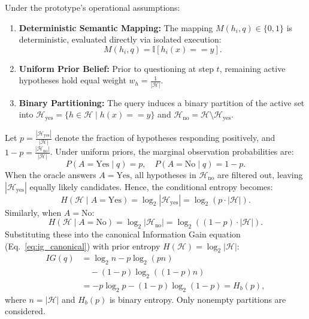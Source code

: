 Under the prototype's operational assumptions:
\begin{enumerate}
    \item \textbf{Deterministic Semantic Mapping:} The mapping $M(h_i, q) \in \{0, 1\}$ is deterministic, evaluated directly via isolated execution:
    \begin{equation}
        M(h_i, q) = \mathbb{I}[h_i(x) == y].
    \end{equation}
    \item \textbf{Uniform Prior Belief:} Prior to questioning at step $t$, remaining active hypotheses hold equal weight $w_h = \frac{1}{|\mathcal{H}|}$.
    \item \textbf{Binary Partitioning:} The query induces a binary partition of the active set into $\mathcal{H}_{\text{yes}} = \{h \in \mathcal{H} \mid h(x) == y\}$ and $\mathcal{H}_{\text{no}} = \mathcal{H} \setminus \mathcal{H}_{\text{yes}}$.
\end{enumerate}

Let $p = \frac{|\mathcal{H}_{\text{yes}}|}{|\mathcal{H}|}$ denote the fraction of hypotheses responding positively, and $1 - p = \frac{|\mathcal{H}_{\text{no}}|}{|\mathcal{H}|}$. Under uniform priors, the marginal observation probabilities are:
\begin{equation}
    P(A = \text{Yes} \mid q) = p, \quad P(A = \text{No} \mid q) = 1 - p.
\end{equation}
When the oracle answers $A = \text{Yes}$, all hypotheses in $\mathcal{H}_{\text{no}}$ are filtered out, leaving $|\mathcal{H}_{\text{yes}}|$ equally likely candidates. Hence, the conditional entropy becomes:
\begin{equation}
    H(\mathcal{H} \mid A = \text{Yes}) = \log_2 |\mathcal{H}_{\text{yes}}| = \log_2 (p \cdot |\mathcal{H}|).
\end{equation}
Similarly, when $A = \text{No}$:
\begin{equation}
    H(\mathcal{H} \mid A = \text{No}) = \log_2 |\mathcal{H}_{\text{no}}| = \log_2 ((1 - p) \cdot |\mathcal{H}|).
\end{equation}
Substituting these into the canonical Information Gain equation (Eq.~\ref{eq:ig_canonical}) with prior entropy $H(\mathcal{H}) = \log_2 |\mathcal{H}|$:
\begin{align}
 IG(q)&=\log_2 n-p\log_2(pn)\nonumber\\
      &\quad -(1-p)\log_2((1-p)n)\nonumber\\
      &=-p\log_2p-(1-p)\log_2(1-p)=H_b(p),
\end{align}
where $n=|\mathcal H|$ and $H_b(p)$ is binary entropy. Only nonempty partitions are considered.

